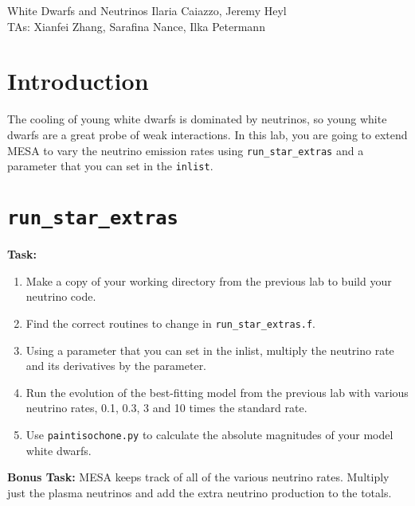 \documentclass{article}
\begin{document}
\begin{titlebox}{White Dwarfs and Neutrinos}
Ilaria Caiazzo, Jeremy Heyl \\
TAs: Xianfei Zhang, Sarafina Nance, Ilka Petermann
\end{titlebox}

\section{Introduction}

The cooling of young white dwarfs is dominated by neutrinos, so young white dwarfs are a great probe of weak interactions.  In this lab, you are going to extend MESA to vary the neutrino emission rates using \texttt{run\_star\_extras} and a parameter that you can set in the \texttt{inlist}.

\section{\texttt{run\_star\_extras}}

\textbf{Task:}
\begin{enumerate}
 \setlength\itemsep{0em}
 \item 
Make a copy of your working directory from the previous lab to build your neutrino code.
\item 
Find the correct routines to change in \texttt{run\_star\_extras.f}.
\item 
Using a parameter that you can set in the inlist, multiply the neutrino rate and its derivatives by the parameter.
\item
Run the evolution of the best-fitting model from the previous lab with various neutrino rates, 0.1, 0.3, 3 and 10 times the standard rate.
\item Use \texttt{paintisochone.py} to calculate the absolute magnitudes of your model white dwarfs.
\end{enumerate}

\textbf{Bonus Task:}
MESA keeps track of all of the various neutrino rates.  Multiply just the plasma neutrinos and add the extra neutrino production to the totals.


\end{document}
